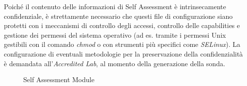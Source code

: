 \documentclass[../main.tex]{subfiles}
\begin{document}
Poiché il contenuto delle informazioni di Self Assessment è intrinsecamente confidenziale, è strettamente necessario che questi file di configurazione siano protetti con i meccanismi di controllo degli accessi, controllo delle capabilities e gestione dei permessi del sistema operativo (ad es. tramite i permessi Unix gestibili con il comando \textit{chmod} o con strumenti più specifici come \textit{SELinux}).
La configurazione di eventuali metodologie per la preservazione della confidenzialità è demandata all'\textit{Accredited Lab}, al momento della generazione della sonda.
\begin{figure}[H]
\centering
{}
\caption{Self Assessment Module}\label{fig:SelfAssessment}
\end{figure}
\newpage
\end{document}
